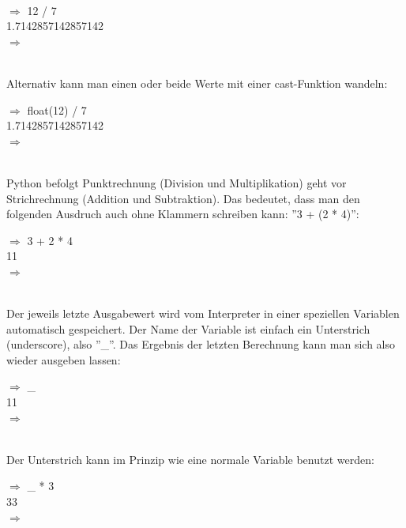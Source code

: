 \\
\begin{MyConsoleBox}{
  ${\Longrightarrow}$ 12 / 7 \\
  1.7142857142857142 \\
  ${\Longrightarrow}$ \\
}\end{MyConsoleBox}
\\
Alternativ kann man einen oder beide Werte mit einer cast-Funktion wandeln:
\\
\begin{MyConsoleBox}{
  ${\Longrightarrow}$ float(12) / 7 \\
  1.7142857142857142 \\
  ${\Longrightarrow}$ \\
}\end{MyConsoleBox}
\\
Python befolgt Punktrechnung (Division und Multiplikation) geht vor Strichrechnung (Addition und Subtraktion).
Das bedeutet, dass man den folgenden Ausdruch auch ohne Klammern schreiben kann: ''3 + (2 * 4)'':
\\
\begin{MyConsoleBox}{
  ${\Longrightarrow}$ 3 + 2 * 4 \\
  11 \\
  ${\Longrightarrow}$ \\
}\end{MyConsoleBox}
\\
Der jeweils letzte Ausgabewert wird vom Interpreter in einer speziellen Variablen automatisch gespeichert. Der Name der Variable ist einfach ein Unterstrich (underscore), also ''\_''.
Das Ergebnis der letzten Berechnung kann man sich also wieder ausgeben lassen:
\\
\begin{MyConsoleBox}{
  ${\Longrightarrow}$ \_ \\
  11 \\
  ${\Longrightarrow}$ \\
}\end{MyConsoleBox}
\\
Der Unterstrich kann im Prinzip wie eine normale Variable benutzt werden:
\\
\begin{MyConsoleBox}{
  ${\Longrightarrow}$ \_ * 3\\
  33 \\
  ${\Longrightarrow}$ \\
}\end{MyConsoleBox}
\\
